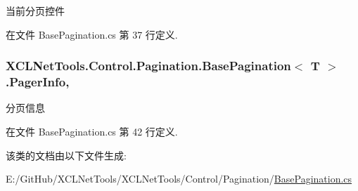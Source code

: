 当前分页控件 



在文件 Base\+Pagination.\+cs 第 37 行定义.

\subsubsection[{\texorpdfstring{Pager\+Info}{PagerInfo}}]{ {\bf X\+C\+L\+Net\+Tools.\+Control.\+Pagination.\+Base\+Pagination}$<$ T $>$.Pager\+Info\hspace{0.3cm}{\ttfamily [get]}, {\ttfamily [set]}}\hypertarget{class_x_c_l_net_tools_1_1_control_1_1_pagination_1_1_base_pagination_ae27d645cd692bb7471bc6236c59496a3}{}\label{class_x_c_l_net_tools_1_1_control_1_1_pagination_1_1_base_pagination_ae27d645cd692bb7471bc6236c59496a3}


分页信息 



在文件 Base\+Pagination.\+cs 第 42 行定义.



该类的文档由以下文件生成\+:\begin{DoxyCompactItemize}
\item 
E\+:/\+Git\+Hub/\+X\+C\+L\+Net\+Tools/\+X\+C\+L\+Net\+Tools/\+Control/\+Pagination/\hyperlink{_base_pagination_8cs}{Base\+Pagination.\+cs}\end{DoxyCompactItemize}
